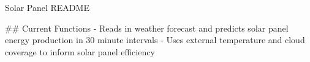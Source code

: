 Solar Panel README

## Current Functions
- Reads in weather forecast and predicts solar panel energy production in 30 minute intervals
- Uses external temperature and cloud coverage to inform solar panel efficiency 